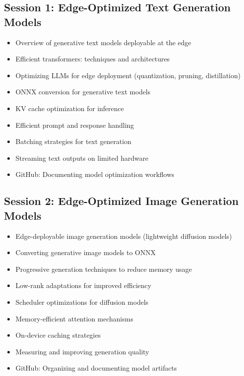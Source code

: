 \documentclass[11pt]{article}
\begin{document}
	\subsection{Session 1: Edge-Optimized Text Generation Models}
	\label{subsec:week3-session1}
	\begin{itemize}
		\item Overview of generative text models deployable at the edge
		\item Efficient transformers: techniques and architectures
		\item Optimizing LLMs for edge deployment (quantization, pruning, distillation)
		\item ONNX conversion for generative text models
		\item KV cache optimization for inference
		\item Efficient prompt and response handling
		\item Batching strategies for text generation
		\item Streaming text outputs on limited hardware
		\item GitHub: Documenting model optimization workflows
	\end{itemize}
	
	\begin{center}
	\end{center}
	
	\subsection{Session 2: Edge-Optimized Image Generation Models}
	\label{subsec:week3-session2}
	\begin{itemize}
		\item Edge-deployable image generation models (lightweight diffusion models)
		\item Converting generative image models to ONNX
		\item Progressive generation techniques to reduce memory usage
		\item Low-rank adaptations for improved efficiency
		\item Scheduler optimizations for diffusion models
		\item Memory-efficient attention mechanisms
		\item On-device caching strategies
		\item Measuring and improving generation quality
		\item GitHub: Organizing and documenting model artifacts
	\end{itemize}
	
\end{document}
